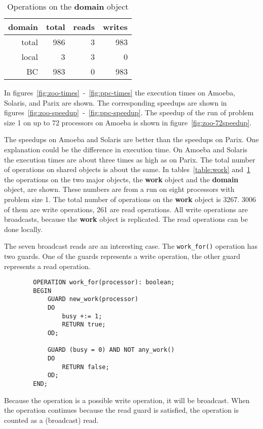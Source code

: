 \documentclass[a4paper,11pt]{article}
\begin{document}
\begin{table}[H]
\begin{center}
\begin{tabular}{|r|r|r|r|}
\hline
{\bf domain}  & total & reads & writes \\
\hline
total & 986 & 3 & 983 \\
local &  3 & 3 &    0 \\
BC    & 983 &   0 & 983 \\
\hline
\end{tabular}
\end{center}
\caption{Operations on the {\bf domain} object}
\label{table:domain}
\end{table}

In
figures~\ref{fig:zoo-times}~-~\ref{fig:ppc-times} the execution times
on Amoeba, Solaris, and Parix are
shown. The corresponding speedups are shown in
figures~\ref{fig:zoo-speedup}~-~\ref{fig:ppc-speedup}.
The speedup of the run of problem size 1 on up to 72 processors
on Amoeba is shown in figure~\ref{fig:zoo-72speedup}.

The speedups on Amoeba and Solaris are better than the speedups on Parix.
One explanation could be  the difference in execution time. On Amoeba and
Solaris the execution times are about three times as high as on Parix.
The total number of operations on shared objects is about the same. 
In tables~\ref{table:work} and~\ref{table:domain} 
the operations on the two major
objects, the {\bf work} object and the {\bf domain} object,
are shown. These numbers are
from a run on eight processors with problem size 1. The total number of
operations on the {\bf work} object is 3267. 3006 of them
are write operations, 261 are
read operations. All write operations are broadcasts, because the {\bf work}
object is replicated. The read operations can be done locally.

The seven broadcast reads are an interesting case.
The {\tt work\_for()} operation has two guards. One of the guards represents
a write operation, the other guard represents a read operation.
\begin{verbatim}
        OPERATION work_for(processor): boolean;
        BEGIN
            GUARD new_work(processor)
            DO
                busy +:= 1;
                RETURN true;
            OD;
        
            GUARD (busy = 0) AND NOT any_work()
            DO
                RETURN false;
            OD;
        END;
\end{verbatim}
Because the operation is a possible write operation, it will be
broadcast. When the operation continues because the read guard is
satisfied, the operation is counted as a (broadcast) read.
\end{document}
